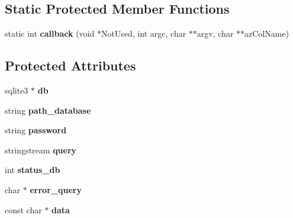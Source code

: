 \subsection*{Static Protected Member Functions}
\begin{DoxyCompactItemize}
\item 
\hypertarget{classSQLite_a2cdec2824226fb74b9c5f53fb2eb9c52}{static int {\bfseries callback} (void $\ast$Not\-Used, int argc, char $\ast$$\ast$argv, char $\ast$$\ast$az\-Col\-Name)}\label{classSQLite_a2cdec2824226fb74b9c5f53fb2eb9c52}

\end{DoxyCompactItemize}
\subsection*{Protected Attributes}
\begin{DoxyCompactItemize}
\item 
\hypertarget{classSQLite_a1d24b48aa333500d31dd1741c474ee77}{sqlite3 $\ast$ {\bfseries db}}\label{classSQLite_a1d24b48aa333500d31dd1741c474ee77}

\item 
\hypertarget{classSQLite_a35c90bc05faa587c66031661a365db20}{string {\bfseries path\-\_\-database}}\label{classSQLite_a35c90bc05faa587c66031661a365db20}

\item 
\hypertarget{classSQLite_a5db7ea6ca4da520fb5125631b081acb9}{string {\bfseries password}}\label{classSQLite_a5db7ea6ca4da520fb5125631b081acb9}

\item 
\hypertarget{classSQLite_a524b7fb749c55eae9076981de81f6576}{stringstream {\bfseries query}}\label{classSQLite_a524b7fb749c55eae9076981de81f6576}

\item 
\hypertarget{classSQLite_ab54d46b70b16ac3d91631c926d633d42}{int {\bfseries status\-\_\-db}}\label{classSQLite_ab54d46b70b16ac3d91631c926d633d42}

\item 
\hypertarget{classSQLite_a641bc6c63769eee5ab03dfd0cd26f0bc}{char $\ast$ {\bfseries error\-\_\-query}}\label{classSQLite_a641bc6c63769eee5ab03dfd0cd26f0bc}

\item 
\hypertarget{classSQLite_a7c608c690c08fce28810d549ab488074}{const char $\ast$ {\bfseries data}}\label{classSQLite_a7c608c690c08fce28810d549ab488074}

\end{DoxyCompactItemize}


